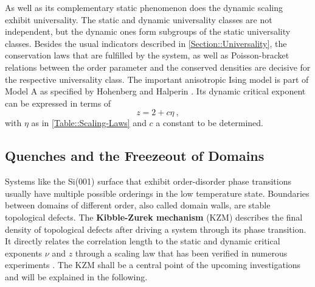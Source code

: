 	As well as its complementary static phenomenon does the dynamic scaling exhibit universality. The static and dynamic universality classes are not independent, but the dynamic ones form subgroups of the static universality classes. Besides the usual indicators described in \autoref{Section::Universality}, the conservation laws that are fulfilled by the system, as well as Poisson-bracket relations between the order parameter and the conserved densities are decisive for the respective universality class. The important anisotropic Ising model is part of Model A as specified by Hohenberg and Halperin \cite{hohenberg1977theory}. Its dynamic critical exponent can be expressed in terms of
	\begin{equation} \label{Eq::Model-A-z}
		z =	2 + c \eta ~,
	\end{equation}
	with $\eta$ as in \autoref{Table::Scaling-Laws} and $c$ a constant to be determined.
	\subsection{Quenches and the Freezeout of Domains}
	Systems like the Si(001) surface that exhibit order-disorder phase transitions usually have multiple possible orderings in the low temperature state. Boundaries between domains of different order, also called domain walls, are stable topological defects. The \textbf{Kibble-Zurek mechanism} (KZM) \cite{kibble1976topology, zurek1985cosmological, zurek1996cosmological} describes the final density of topological defects after driving a system through its phase transition. It directly relates the correlation length to the static and dynamic critical exponents $\nu$ and $z$ through a scaling law that has been verified in numerous experiments \cite{ruutu1996vortex, ulm2013observation, pyka2013topological}. The KZM shall be a central point of the upcoming investigations and will be explained in the following. \\
	
